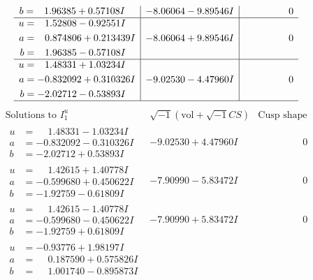 \documentclass[1p]{elsarticle_modified}
\theoremstyle{definition}
\newcommand{\I}{\sqrt{-1}}
\begin{document}
$$\begin{array}{c|c|c}
\begin{aligned}
b &= \phantom{-}1.96385 + 0.57108 I\end{aligned}
 & -8.06064 - 9.89546 I & \phantom{-0.000000 } 0 \\ \hline\begin{aligned}
u &= \phantom{-}1.52808 - 0.92551 I \\
a &= \phantom{-}0.874806 + 0.213439 I \\
b &= \phantom{-}1.96385 - 0.57108 I\end{aligned}
 & -8.06064 + 9.89546 I & \phantom{-0.000000 } 0 \\ \hline\begin{aligned}
u &= \phantom{-}1.48331 + 1.03234 I \\
a &= -0.832092 + 0.310326 I \\
b &= -2.02712 - 0.53893 I\end{aligned}
 & -9.02530 - 4.47960 I & \phantom{-0.000000 } 0\\
 \hline 
 \end{array}$$\newpage$$\begin{array}{c|c|c}  
\text{Solutions to }I^u_{1}& \I (\text{vol} + \sqrt{-1}CS) & \text{Cusp shape}\\
 \hline 
\begin{aligned}
u &= \phantom{-}1.48331 - 1.03234 I \\
a &= -0.832092 - 0.310326 I \\
b &= -2.02712 + 0.53893 I\end{aligned}
 & -9.02530 + 4.47960 I & \phantom{-0.000000 } 0 \\ \hline\begin{aligned}
u &= \phantom{-}1.42615 + 1.40778 I \\
a &= -0.599680 + 0.450622 I \\
b &= -1.92759 - 0.61809 I\end{aligned}
 & -7.90990 - 5.83472 I & \phantom{-0.000000 } 0 \\ \hline\begin{aligned}
u &= \phantom{-}1.42615 - 1.40778 I \\
a &= -0.599680 - 0.450622 I \\
b &= -1.92759 + 0.61809 I\end{aligned}
 & -7.90990 + 5.83472 I & \phantom{-0.000000 } 0 \\ \hline\begin{aligned}
u &= -0.93776 + 1.98197 I \\
a &= \phantom{-}0.187590 + 0.575826 I \\
b &= \phantom{-}1.001740 - 0.895873 I\end{aligned}

\end{array}$$
\end{document}

